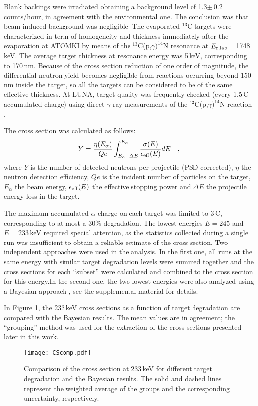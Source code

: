 \documentclass[%
reprint,
groupedaddress,
showpacs,
nofootinbib,
amsmath,amssymb,
aps,
prl,
superscriptaddress,
notitlepage,
floatfix
]{revtex4-2}
\begin{document}
Blank backings were irradiated obtaining a background level of 1.3$\pm$\,0.2  counts/hour, in agreement with the environmental one. The conclusion was that beam induced background was negligible. The evaporated $^{13}$C targets were characterized in term of homogeneity and thickness immediately after the evaporation at ATOMKI by means of the $^{13}$C(p,$\gamma)^{14}$N resonance at $E_{\rm {r,lab}}$= 1748\,keV. The average target thickness at resonance energy was 5\,keV, corresponding to 170\,nm. Because of the cross section reduction of one order of magnitude, the differential neutron yield becomes negligible from reactions occurring beyond 150\,nm inside the target, so all the targets can be considered to be of the same effective thickness.
At LUNA, target quality was frequently checked (every 1.5\,C accumulated charge) using direct $\gamma$-ray measurements of the $^{13}$C(p,$\gamma)^{14}$N reaction \cite{Ciani:2020}.

The cross section was calculated as follows:
\begin{equation}
\label{eq:yield}
Y=\frac{\eta(E_{\alpha})}{Qe}\int^{E_{\rm \alpha}}_{E_{\alpha}-\Delta E}\frac{\sigma(E)}{\epsilon_{\rm{eff}}(E)}dE \quad ,
\end{equation}
where $Y$ is the number of detected neutrons per projectile (PSD corrected), $\eta$ the neutron detection efficiency, $Qe$ is the incident number of particles on the target, $E_{\alpha}$ the beam energy, $\epsilon_{\rm{eff}}(E)$ the effective stopping power and $\Delta E$ the projectile energy loss in the target. 

The maximum accumulated $\alpha$-charge on each target was limited to 3\,C, corresponding to at most a 30\% degradation.%
The lowest energies $E=245$ and $E=233$\,keV required special attention, as the statistics collected during a single run was insufficient to obtain a reliable estimate of the cross section.
Two independent approaches were used in the analysis. In the first one, all runs at the same energy with similar target degradation levels were summed together and the cross sections for each ``subset'' were calculated and combined to the cross section for this energy.In the second one, the two lowest energies were also analyzed using a Bayesian approach \cite{Caldwell:2009}, see the supplemental material for details. 

In Figure \ref{fig:comparisoncross}, the 233\,keV cross sections as a function of target degradation are compared with the Bayesian results. The mean values are in agreement; the ``grouping'' method was used for the extraction of the cross sections presented later in this work.%
\begin{figure}[tb]
    \centering
    \texttt{[image: CScomp.pdf]}
    \caption{Comparison of the cross section at 233\,keV for different target degradation and the Bayesian results. The solid and dashed lines represent the weighted average of the groups and the corresponding uncertainty, respectively.}
    \label{fig:comparisoncross}
\end{figure}
\end{document}
